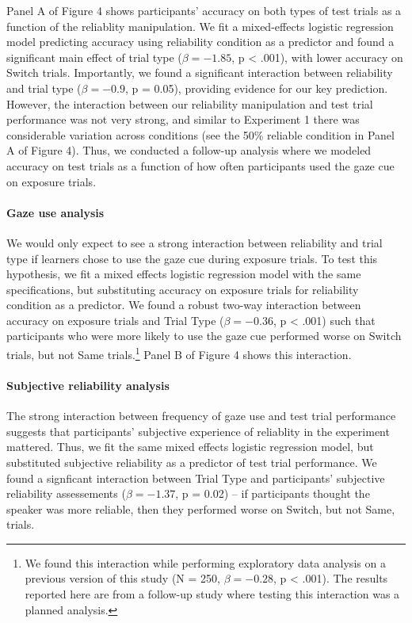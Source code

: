\documentclass[a4paper,man,natbib]{apa6}
\begin{document}
Panel A of Figure 4 shows participants' accuracy on both types of test
trials as a function of the reliablity manipulation. We fit a
mixed-effects logistic regression model predicting accuracy using
reliability condition as a predictor and found a significant main effect
of trial type (\(\beta = -1.85\), p \textless{} .001), with lower
accuracy on Switch trials. Importantly, we found a significant
interaction between reliability and trial type (\(\beta = -0.9\), p =
0.05), providing evidence for our key prediction. However, the
interaction between our reliability manipulation and test trial
performance was not very strong, and similar to Experiment 1 there was
considerable variation across conditions (see the 50\% reliable
condition in Panel A of Figure 4). Thus, we conducted a follow-up
analysis where we modeled accuracy on test trials as a function of how
often participants used the gaze cue on exposure trials.

\paragraph{Gaze use analysis}\label{gaze-use-analysis}

We would only expect to see a strong interaction between reliability and
trial type if learners chose to use the gaze cue during exposure trials.
To test this hypothesis, we fit a mixed effects logistic regression
model with the same specifications, but substituting accuracy on
exposure trials for reliability condition as a predictor. We found a
robust two-way interaction between accuracy on exposure trials and Trial
Type (\(\beta = -0.36\), p \textless{} .001) such that participants who
were more likely to use the gaze cue performed worse on Switch trials,
but not Same trials.\footnote{We found this interaction while performing
  exploratory data analysis on a previous version of this study (N =
  250, \(\beta = -0.28\), p \textless{} .001). The results reported here
  are from a follow-up study where testing this interaction was a
  planned analysis.} Panel B of Figure 4 shows this interaction.

\paragraph{Subjective reliability
analysis}\label{subjective-reliability-analysis}

The strong interaction between frequency of gaze use and test trial
performance suggests that participants' subjective experience of
reliablity in the experiment mattered. Thus, we fit the same mixed
effects logistic regression model, but substituted subjective
reliability as a predictor of test trial performance. We found a
signficant interaction between Trial Type and participants' subjective
reliability assessements (\(\beta = -1.37\), p = 0.02) -- if
participants thought the speaker was more reliable, then they performed
worse on Switch, but not Same, trials.
\end{document}
